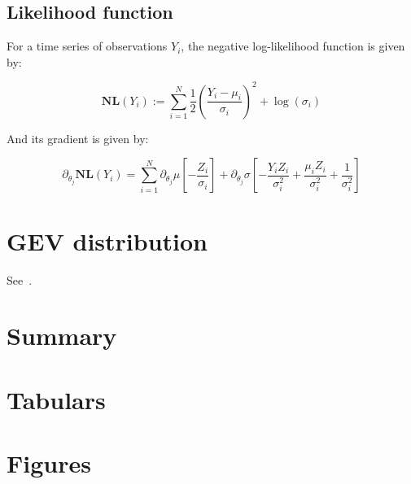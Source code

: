 \documentclass[12pt,a4paper]{article}
\theoremstyle{plain}
\theoremstyle{definition}
\theoremstyle{remark}
\begin{document}
\subsection{Likelihood function} %

\noindent For a time series of observations $Y_i$, the negative log-likelihood
function is given by:

\[\mathbf{NL}(Y_i):=\sum_{i=1}^N
\frac{1}{2}\left(\frac{Y_i-\mu_i}{\sigma_i}\right)^2 + \log(\sigma_i)\]

\noindent And its gradient is given by:

\[
\partial_{\theta_j}\mathbf{NL}(Y_i)=\sum_{i=1}^N
\partial_{\theta_j}\mu\left[-\frac{Z_i}{\sigma_i}\right] +
\partial_{\theta_j}\sigma\left[-\frac{Y_iZ_i}{\sigma_i^2}+\frac{\mu_iZ_i}{\sigma_i^2}+\frac{1}{\sigma_i^2}\right]
\]



\section{GEV distribution} %

\noindent See~\citet{Hosking1985}.


\section*{Summary} %



\clearpage
\newpage
\pagebreak[4]

\appendix


\clearpage
\newpage
\pagebreak[4]
\printbibliography



\clearpage
\newpage
\pagebreak[4]


\section*{Tabulars} %

\clearpage
\newpage
\pagebreak[4]

\section*{Figures} %



\end{document}

